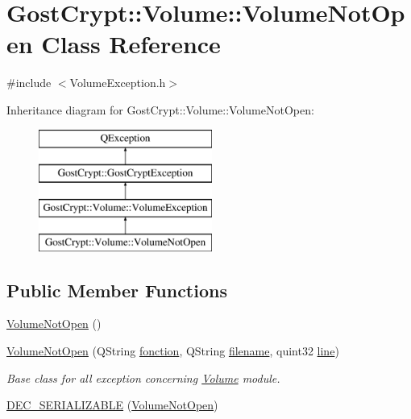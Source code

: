 \hypertarget{class_gost_crypt_1_1_volume_1_1_volume_not_open}{}\section{Gost\+Crypt\+:\+:Volume\+:\+:Volume\+Not\+Open Class Reference}
\label{class_gost_crypt_1_1_volume_1_1_volume_not_open}


{\ttfamily \#include $<$Volume\+Exception.\+h$>$}

Inheritance diagram for Gost\+Crypt\+:\+:Volume\+:\+:Volume\+Not\+Open\+:\begin{figure}[H]
\begin{center}
\leavevmode
\includegraphics[height=4.000000cm]{class_gost_crypt_1_1_volume_1_1_volume_not_open}
\end{center}
\end{figure}
\subsection*{Public Member Functions}
\begin{DoxyCompactItemize}
\item 
\hyperlink{class_gost_crypt_1_1_volume_1_1_volume_not_open_a69718ab5e96c86ab13ca7662642e5b03}{Volume\+Not\+Open} ()
\item 
\hyperlink{class_gost_crypt_1_1_volume_1_1_volume_not_open_a67824ff9fcea59a6d940aa0b09683615}{Volume\+Not\+Open} (Q\+String \hyperlink{class_gost_crypt_1_1_gost_crypt_exception_a29b8c93d5efbb1ff369107385725a939}{fonction}, Q\+String \hyperlink{class_gost_crypt_1_1_gost_crypt_exception_a749a12375f4ba9d502623b99d8252f38}{filename}, quint32 \hyperlink{class_gost_crypt_1_1_gost_crypt_exception_abf506d911f12a4e969eea500f90bd32c}{line})
\begin{DoxyCompactList}\small\item\em Base class for all exception concerning \hyperlink{class_gost_crypt_1_1_volume_1_1_volume}{Volume} module. \end{DoxyCompactList}\item 
\hyperlink{class_gost_crypt_1_1_volume_1_1_volume_not_open_a67323ab0533700a57677377977ab8868}{D\+E\+C\+\_\+\+S\+E\+R\+I\+A\+L\+I\+Z\+A\+B\+LE} (\hyperlink{class_gost_crypt_1_1_volume_1_1_volume_not_open}{Volume\+Not\+Open})
\end{DoxyCompactItemize}
